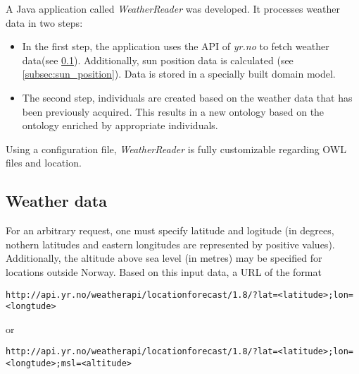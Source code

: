 A Java application called \emph{WeatherReader} was developed. It processes weather data in two steps:

\begin{itemize}
  \item In the first step, the application uses the API of \emph{yr.no} to fetch weather data(see \ref{subsec:weather_data_yr_no}). Additionally, sun position data is calculated (see \ref{subsec:sun_position}). Data is stored in a specially built domain model. %
  \item The second step, individuals are created based on the weather data that has been previously acquired. This results in a new ontology based on the \thinkhomeweather ontology enriched by appropriate individuals.
\end{itemize}


Using a configuration file, \emph{WeatherReader} is fully customizable regarding OWL files and location.

\subsection{Weather data}
\label{subsec:weather_data_yr_no}


For an arbitrary request, one must specify latitude and logitude (in degrees, nothern latitudes and eastern longitudes are represented by positive values). Additionally, the altitude above sea level (in metres) may be specified for locations outside Norway. Based on this input data, a URL of the format

\lstset{frame=trbl}
\begin{lstlisting}
http://api.yr.no/weatherapi/locationforecast/1.8/?lat=<latitude>;lon=<longtude>
\end{lstlisting}

or

\begin{lstlisting}
http://api.yr.no/weatherapi/locationforecast/1.8/?lat=<latitude>;lon=<longtude>;msl=<altitude>
\end{lstlisting}

